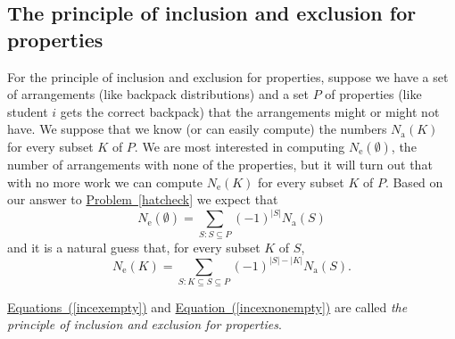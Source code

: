 \documentclass[10pt,]{book}
\theoremstyle{plain}
\theoremstyle{definition}
\numberwithin{equation}{chapter}
\begin{document}
\subsection[{The principle of inclusion and exclusion for properties}]{The principle of inclusion and exclusion for properties}\label{subsection-37}
For the principle of inclusion and exclusion for properties, suppose we have a set of arrangements (like backpack distributions) and a set \(P\) of properties (like student \(i\) gets the correct backpack) that the arrangements might or might not have. We suppose that we know (or can easily compute) the numbers \(N_{\mbox{a} }(K)\) for every subset \(K\) of \(P\). We are most interested in computing \(N_{\mbox{e} }(\emptyset)\), the number of arrangements with none of the properties, but it will turn out that with no more work we can compute \(N_{\mbox{e} }(K)\) for every subset \(K\) of \(P\). Based on our answer to \hyperref[hatcheck]{Problem~\ref{hatcheck}} we expect that%
\begin{equation}
N_{\mbox{e} }(\emptyset) = \sum_{S: S\subseteq P} (-1)^{|S|}N_{\mbox{a} }(S)\label{incexempty}
\end{equation}
and it is a natural guess that, for every subset \(K\) of \(S\),%
\begin{equation}
N_{\mbox{e} }(K) = \sum_{S: K\subseteq S\subseteq P}
(-1)^{|S|-|K|}N_{\mbox{a} }(S).\label{incexnonempty}
\end{equation}
%
\par
\hyperref[incexempty]{Equations~(\ref{incexempty})} and \hyperref[incexnonempty]{Equation~(\ref{incexnonempty})} are called \emph{the principle of inclusion and exclusion for properties}.%
\end{document}
